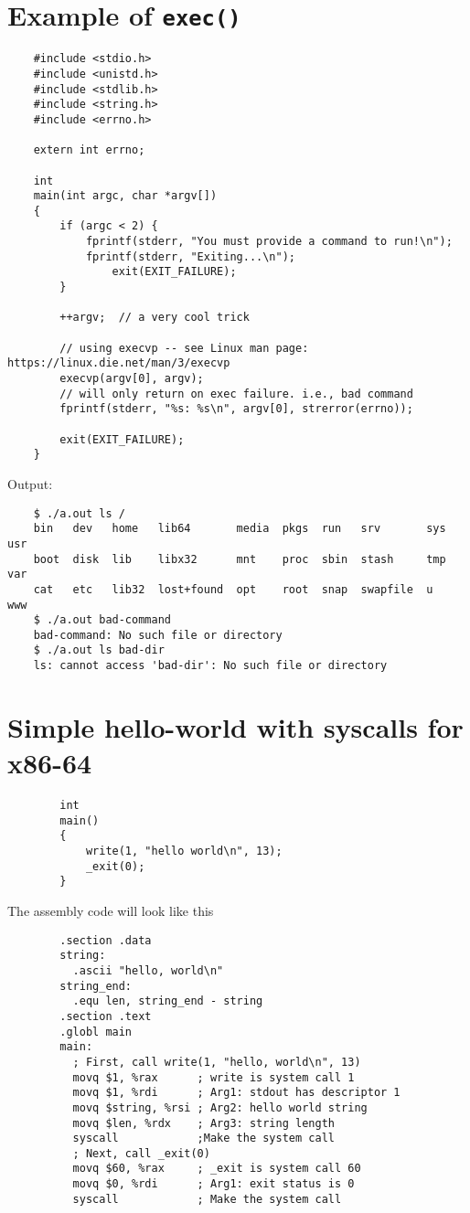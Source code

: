 \documentclass[12pt,letterpaper]{article}
\begin{document}
    \section{Example of {\tt exec()}}
    \begin{verbatim}
    #include <stdio.h>
    #include <unistd.h>
    #include <stdlib.h>
    #include <string.h>
    #include <errno.h>
        
    extern int errno;
        
    int
    main(int argc, char *argv[])
    {
        if (argc < 2) {
            fprintf(stderr, "You must provide a command to run!\n");
            fprintf(stderr, "Exiting...\n");
                exit(EXIT_FAILURE);
        }
            
        ++argv;  // a very cool trick
            
        // using execvp -- see Linux man page: https://linux.die.net/man/3/execvp
        execvp(argv[0], argv);
        // will only return on exec failure. i.e., bad command
        fprintf(stderr, "%s: %s\n", argv[0], strerror(errno));
            
        exit(EXIT_FAILURE);
    }
    \end{verbatim}
    \noindent Output:
    \begin{verbatim}
    $ ./a.out ls /
    bin   dev   home   lib64       media  pkgs  run   srv       sys  usr
    boot  disk  lib    libx32      mnt    proc  sbin  stash     tmp  var
    cat   etc   lib32  lost+found  opt    root  snap  swapfile  u    www
    $ ./a.out bad-command
    bad-command: No such file or directory
    $ ./a.out ls bad-dir
    ls: cannot access 'bad-dir': No such file or directory
    \end{verbatim}
    


    \section{Simple hello-world with syscalls for x86-64}
    \begin{verbatim}
        int
        main()
        {
            write(1, "hello world\n", 13);
            _exit(0);
        }
    \end{verbatim}
    
    The assembly code will look like this
    \begin{verbatim}
        .section .data
        string:
          .ascii "hello, world\n"
        string_end:
          .equ len, string_end - string
        .section .text
        .globl main
        main:
          ; First, call write(1, "hello, world\n", 13)
          movq $1, %rax      ; write is system call 1
          movq $1, %rdi      ; Arg1: stdout has descriptor 1
          movq $string, %rsi ; Arg2: hello world string
          movq $len, %rdx    ; Arg3: string length
          syscall            ;Make the system call
          ; Next, call _exit(0)
          movq $60, %rax     ; _exit is system call 60
          movq $0, %rdi      ; Arg1: exit status is 0
          syscall            ; Make the system call
    \end{verbatim}
\end{document}
